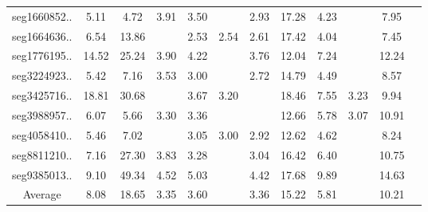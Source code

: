 \begin{table}[t]
\begin{tabular}{cccccccccccc}
    seg1660852.. & 5.11 & 4.72 & 3.91 & 3.50 & \cellcolor{yellow}{2.92} & 2.93 & 17.28 & 4.23 & \cellcolor{red}{2.62} & 7.95 & \cellcolor{orange}{2.68} \\
    seg1664636.. & 6.54 & 13.86 & \cellcolor{yellow}{2.26} & 2.53 & 2.54 & 2.61 & 17.42 & 4.04 & \cellcolor{orange}{1.94} & 7.45 & \cellcolor{red}{1.66} \\
    seg1776195.. & 14.52 & 25.24 & 3.90 & 4.22 & \cellcolor{yellow}{3.72} & 3.76 & 12.04 & 7.24 & \cellcolor{orange}{3.58} & 12.24 & \cellcolor{red}{3.56} \\
    seg3224923.. & 5.42 & 7.16 & 3.53 & 3.00 & \cellcolor{yellow}{2.43} & 2.72 & 14.79 & 4.49 & \cellcolor{red}{2.07} & 8.57 & \cellcolor{orange}{2.21} \\
    seg3425716.. & 18.81 & 30.68 & \cellcolor{orange}{3.00} & 3.67 & 3.20 & \cellcolor{yellow}{3.03} & 18.46 & 7.55 & 3.23 & 9.94 & \cellcolor{red}{2.95} \\
    seg3988957.. & 6.07 & 5.66 & 3.30 & 3.36 & \cellcolor{orange}{2.95} & \cellcolor{yellow}{2.98} & 12.66 & 5.78 & 3.07 & 10.91 & \cellcolor{red}{2.90} \\
    seg4058410.. & 5.46 & 7.02 & \cellcolor{yellow}{2.62} & 3.05 & 3.00 & 2.92 & 12.62 & 4.62 & \cellcolor{red}{2.37} & 8.24 & \cellcolor{orange}{2.48} \\
    seg8811210.. & 7.16 & 27.30 & 3.83 & 3.28 & \cellcolor{yellow}{2.94} & 3.04 & 16.42 & 6.40 & \cellcolor{orange}{2.75} & 10.75 & \cellcolor{red}{2.70} \\
    seg9385013.. & 9.10 & 49.34 & 4.52 & 5.03 & \cellcolor{yellow}{4.34} & 4.42 & 17.68 & 9.89 & \cellcolor{red}{4.08} & 14.63 & \cellcolor{orange}{4.33} \\
    \midrule
    Average & 8.08 & 18.65 & 3.35 & 3.60 & \cellcolor{yellow}{3.25} & 3.36 & 15.22 & 5.81 & \cellcolor{orange}{2.89} & 10.21 & \cellcolor{red}{2.83} \\
    \bottomrule
    \end{tabular}
    \label{tab:waymo-all}
    \end{table}

